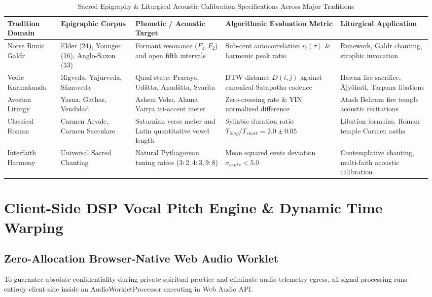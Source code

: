 \documentclass[11pt,a4paper,reqno]{article}
\def\texttt#1{#1}%
\def\mathrm#1{#1}%
\def\mathcal#1{#1}%
\theoremstyle{plain}
\theoremstyle{definition}
\theoremstyle{remark}
\numberwithin{equation}{section}
\begin{document}
\begin{table}[t]
\centering
\caption{Sacred Epigraphy \& Liturgical Acoustic Calibration Specifications Across Major Traditions}
\label{tab:epigraphy_matrix}
\begin{tabularx}{\textwidth}{P{2.6cm} P{2.6cm} P{3.4cm} P{3.8cm} Y}
\toprule
\textbf{Tradition Domain} & \textbf{Epigraphic Corpus} & \textbf{Phonetic / Acoustic Target} & \textbf{Algorithmic Evaluation Metric} & \textbf{Liturgical Application} \\
\midrule
Norse Runic Galdr & Elder (24), Younger (16), Anglo-Saxon (33) & Formant resonance ($F_1, F_2$) and open fifth intervals & Sub-cent autocorrelation $r_t(\tau)$ \& harmonic peak ratio & Runework, Galdr chanting, strophic invocation \\
Vedic Karmakanda & Rigveda, Yajurveda, S\={a}maveda & Quad-state: Pracaya, Ud\={a}tta, Anud\={a}tta, Svarita & DTW distance $\mathcal{D}(i, j)$ against canonical \'{S}atapatha cadence & Hawan fire sacrifice, \={A}jy\={a}huti, Tarpana libations \\
Avestan Liturgy & Yasna, Gathas, Vendidad & Ashem Vohu, Ahuna Vairya tri-accent meter & Zero-crossing rate \& YIN normalized difference & Atash Behram fire temple acoustic recitations \\
Classical Roman & Carmen Arvale, Carmen Saeculare & Saturnian verse meter and Latin quantitative vowel length & Syllabic duration ratio $T_{\mathrm{long}}/T_{\mathrm{short}} = 2.0 \pm 0.05$ & Libation formulas, Roman temple Carmen oaths \\
Interfaith Harmony & Universal Sacred Chanting & Natural Pythagorean tuning ratios ($3:2, 4:3, 9:8$) & Mean squared cents deviation $\sigma_{\mathrm{cents}} < 5.0$ & Contemplative chanting, multi-faith acoustic calibration \\
\bottomrule
\end{tabularx}
\end{table}

\section{\texorpdfstring{Client-Side DSP Vocal Pitch Engine \& Dynamic Time Warping}{Client-Side DSP Vocal Pitch Engine and Dynamic Time Warping}}
\label{sec:dsp}

\subsection{\texorpdfstring{Zero-Allocation Browser-Native Web Audio Worklet}{Zero-Allocation Browser-Native Web Audio Worklet}}
To guarantee absolute confidentiality during private spiritual practice and eliminate audio telemetry egress, all signal processing runs entirely client-side inside an \texttt{AudioWorkletProcessor} executing in Web Audio API.
\end{document}
